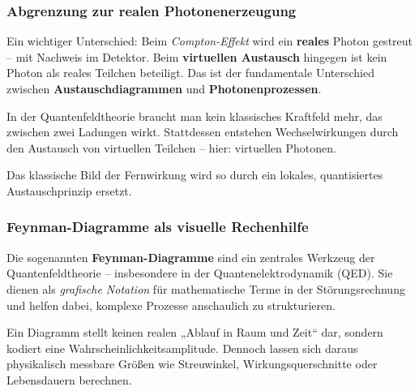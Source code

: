 \subsubsection*{Abgrenzung zur realen Photonenerzeugung}
Ein wichtiger Unterschied: Beim \emph{Compton-Effekt} wird ein \textbf{reales} Photon gestreut – mit Nachweis im Detektor. Beim \textbf{virtuellen Austausch} hingegen ist kein Photon als reales Teilchen beteiligt. Das ist der fundamentale Unterschied zwischen \textbf{Austauschdiagrammen} und \textbf{Photonenprozessen}.

\medskip

\begin{tcolorbox}[didaktikbox, title=Keine „unsichtbare Kraft“ mehr nötig]
	\label{box:unsichtbare Kraft}
	In der Quantenfeldtheorie braucht man kein klassisches Kraftfeld mehr, das zwischen zwei Ladungen wirkt. Stattdessen entstehen Wechselwirkungen durch den Austausch von virtuellen Teilchen – hier: virtuellen Photonen.
	
	Das klassische Bild der Fernwirkung wird so durch ein lokales, quantisiertes Austauschprinzip ersetzt.
\end{tcolorbox}

\subsubsection{Feynman-Diagramme als visuelle Rechenhilfe}

Die sogenannten \textbf{Feynman-Diagramme} sind ein zentrales Werkzeug der Quantenfeldtheorie – insbesondere in der Quantenelektrodynamik (QED). Sie dienen als \emph{grafische Notation} für mathematische Terme in der Störungsrechnung und helfen dabei, komplexe Prozesse anschaulich zu strukturieren.

Ein Diagramm stellt keinen realen „Ablauf in Raum und Zeit“ dar, sondern kodiert eine Wahrscheinlichkeitsamplitude. Dennoch lassen sich daraus physikalisch messbare Größen wie Streuwinkel, Wirkungsquerschnitte oder Lebensdauern berechnen.


